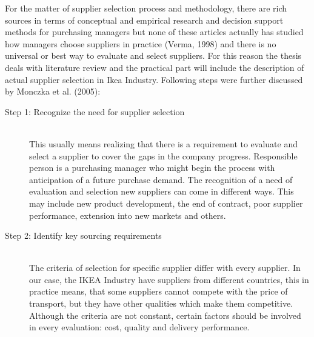 \documentclass[oneside,12pt]{article}%
\begin{document}
For the matter of supplier selection process and methodology, there are rich sources in terms of conceptual and empirical research and decision support methods for purchasing managers but none of these articles actually has studied how managers choose suppliers in practice (Verma, 1998) and there is no universal or best way to evaluate and select suppliers. For this reason the thesis deals with literature review and the practical part will include the description of actual supplier selection in Ikea Industry. Following steps were further discussed by Monczka et al. (2005):


\begin{description}
  \item[Step 1: Recognize the need for supplier selection] \hfill \\
  This usually means realizing that there is a requirement to evaluate and select a supplier to cover the gaps in the company progress. Responsible person is a purchasing manager who might begin the process with anticipation of a future purchase demand. The recognition of a need of evaluation and selection new suppliers can come in different ways. This may include new product development, the end of contract, poor supplier performance, extension into new markets and others.

  \item[Step 2: Identify key sourcing requirements] \hfill \\
  The criteria of selection for specific supplier differ with every supplier. In our case, the IKEA Industry have suppliers from different countries, this in practice means, that some suppliers cannot compete with the price of transport, but they have other qualities which make them competitive. Although the criteria are not constant, certain factors should be involved in every evaluation: cost, quality and delivery performance.


\end{description}
\end{document}
